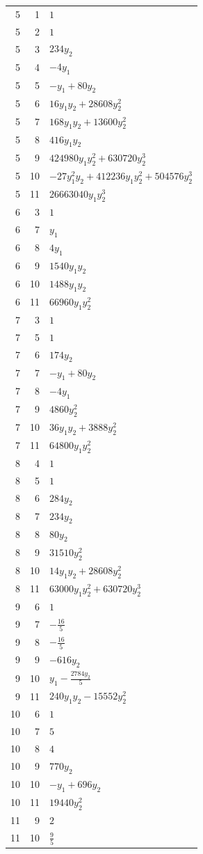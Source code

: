 \documentclass[10pt,a4paper]{article}
\begin{document}
{\begin{longtable}{rrp{125mm}}
5 & 1 & $1$\\
5 & 2 & $1$\\
5 & 3 & $234 y_{2}$\\
5 & 4 & $- 4 y_{1}$\\
5 & 5 & $- y_{1} + 80 y_{2}$\\
5 & 6 & $16 y_{1} y_{2} + 28608 y_{2}^{2}$\\
5 & 7 & $168 y_{1} y_{2} + 13600 y_{2}^{2}$\\
5 & 8 & $416 y_{1} y_{2}$\\
5 & 9 & $424980 y_{1} y_{2}^{2} + 630720 y_{2}^{3}$\\
5 & 10 & $- 27 y_{1}^{2} y_{2} + 412236 y_{1} y_{2}^{2} + 504576 y_{2}^{3}$\\
5 & 11 & $26663040 y_{1} y_{2}^{3}$\\
6 & 3 & $1$\\
6 & 7 & $y_{1}$\\
6 & 8 & $4 y_{1}$\\
6 & 9 & $1540 y_{1} y_{2}$\\
6 & 10 & $1488 y_{1} y_{2}$\\
6 & 11 & $66960 y_{1} y_{2}^{2}$\\
7 & 3 & $1$\\
7 & 5 & $1$\\
7 & 6 & $174 y_{2}$\\
7 & 7 & $- y_{1} + 80 y_{2}$\\
7 & 8 & $- 4 y_{1}$\\
7 & 9 & $4860 y_{2}^{2}$\\
7 & 10 & $36 y_{1} y_{2} + 3888 y_{2}^{2}$\\
7 & 11 & $64800 y_{1} y_{2}^{2}$\\
8 & 4 & $1$\\
8 & 5 & $1$\\
8 & 6 & $284 y_{2}$\\
8 & 7 & $234 y_{2}$\\
8 & 8 & $80 y_{2}$\\
8 & 9 & $31510 y_{2}^{2}$\\
8 & 10 & $14 y_{1} y_{2} + 28608 y_{2}^{2}$\\
8 & 11 & $63000 y_{1} y_{2}^{2} + 630720 y_{2}^{3}$\\
9 & 6 & $1$\\
9 & 7 & $- \frac{16}{5}$\\
9 & 8 & $- \frac{16}{5}$\\
9 & 9 & $- 616 y_{2}$\\
9 & 10 & $y_{1} - \frac{2784 y_{2}}{5}$\\
9 & 11 & $240 y_{1} y_{2} - 15552 y_{2}^{2}$\\
10 & 6 & $1$\\
10 & 7 & $5$\\
10 & 8 & $4$\\
10 & 9 & $770 y_{2}$\\
10 & 10 & $- y_{1} + 696 y_{2}$\\
10 & 11 & $19440 y_{2}^{2}$\\
11 & 9 & $2$\\
11 & 10 & $\frac{9}{5}$\\
\end{longtable}}
\end{document}
